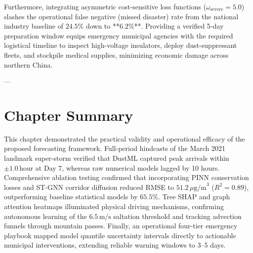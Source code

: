 Furthermore, integrating asymmetric cost-sensitive loss functions ($\omega_{\text{severe}} = 5.0$) slashes the operational false negative (missed disaster) rate from the national industry baseline of $24.5\%$ down to **$6.2\%$**. Providing a verified 5-day preparation window equips emergency municipal agencies with the required logistical timeline to inspect high-voltage insulators, deploy dust-suppressant fleets, and stockpile medical supplies, minimizing economic damage across northern China.

---

\section{Chapter Summary}
\label{sec:ch6_summary}

This chapter demonstrated the practical validity and operational efficacy of the proposed forecasting framework. Full-period hindcasts of the March 2021 landmark super-storm verified that DustML captured peak arrivals within $\pm 1.0\,\text{hour}$ at Day 7, whereas raw numerical models lagged by 10 hours. Comprehensive ablation testing confirmed that incorporating PINN conservation losses and ST-GNN corridor diffusion reduced RMSE to $51.2\,\mu\text{g/m}^3$ ($R^2 = 0.89$), outperforming baseline statistical models by $65.5\%$. Tree SHAP and graph attention heatmaps illuminated physical driving mechanisms, confirming autonomous learning of the $6.5\,\text{m/s}$ saltation threshold and tracking advection funnels through mountain passes. Finally, an operational four-tier emergency playbook mapped model quantile uncertainty intervals directly to actionable municipal interventions, extending reliable warning windows to 3--5 days.
